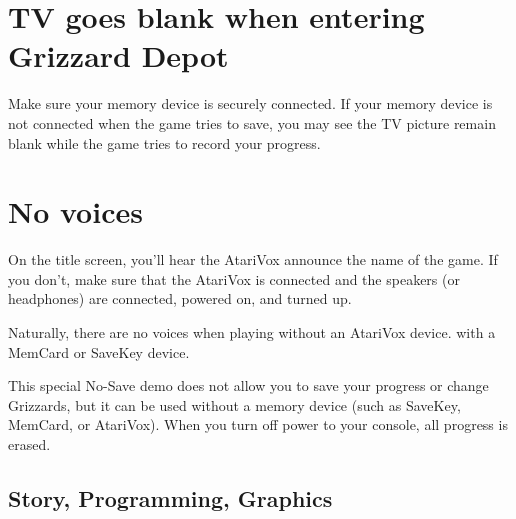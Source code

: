 \documentclass[10pt,twocolumn,openany,article]{memoir}
\begin{document}
\fi

\ifdefined\NOSAVE\else\ifdefined\ATARIAGESAVE\else

\section*{TV goes blank when entering Grizzard Depot}

Make  sure your  memory device  is  securely connected.  If your  memory
device is not connected when the game  tries to save, you may see the TV
picture remain blank while the game tries to record your progress.

\fi

\section*{No voices}

On the title  screen, you'll hear the AtariVox announce  the name of the
game. If  you don't, make  sure that the  AtariVox is connected  and the
speakers (or headphones) are connected, powered on, and turned up.

Naturally,  there are  no  voices  when playing  \ifdefined\ATARIAGESAVE
without an AtariVox device. \else with a MemCard or SaveKey device. \fi

\fi

\ifdefined\NOSAVE

\pagebreak
{}

This special  No-Save demo does not  allow you to save  your progress or
change Grizzards,  but it can be  used without a memory  device (such as
SaveKey, MemCard, or AtariVox). When you turn off power to your console,
all progress is erased.

\fi

\fi %


\vfill


\pagebreak


\subsection{Story, Programming, Graphics}
\end{document}
